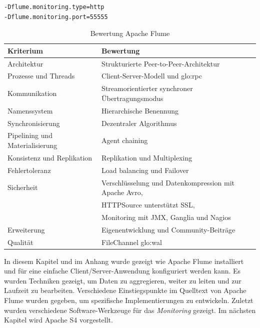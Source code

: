 \begin{lstlisting}[language=BASH, label=lst:flumeMonitoring, caption=Apache Flume Monitoring]
-Dflume.monitoring.type=http
-Dflume.monitoring.port=55555
\end{lstlisting}

\begin{table}[ht!]
	\centering
		\begin{tabular}{@{}ll@{}} \toprule
			\textbf{Kriterium} & \textbf{Bewertung} \\ \midrule
			Architektur & Strukturierte Peer-to-Peer-Architektur \\
			Prozesse und Threads & Client-Server-Modell und \gls{glo:rpc} \\
			Kommunikation & Streamorientierter synchroner Übertragungsmodus \\
			Namenssystem & Hierarchische Benennung \\
			Synchronisierung & Dezentraler Algorithmus \\
			Pipelining und Materialisierung & Agent chaining \\
			Konsistenz und Replikation & Replikation und Multiplexing \\
			Fehlertoleranz & Load balancing und Failover \\ 
			Sicherheit & Verschlüsselung und Datenkompression mit Apache Avro, \\			
			& HTTPSource unterstützt SSL, \\
			& Monitoring mit JMX, Ganglia und Nagios\\
			Erweiterung & Eigenentwicklung und Community-Beiträge \\
			Qualität & FileChannel \gls{glo:wal} \\
			\bottomrule			
		\end{tabular}
	\caption{Bewertung Apache Flume}
	\label{tab:bewflume}
\end{table}

In diesem Kapitel und im Anhang wurde gezeigt wie Apache Flume installiert und für eine einfache Client/Server-Anwendung konfiguriert werden kann. Es wurden Techniken gezeigt, um Daten zu aggregieren, weiter zu leiten und zur Laufzeit zu bearbeiten. Verschiedene Einstiegspunkte im Quelltext von Apache Flume wurden gegeben, um spezifische Implementierungen zu entwickeln. Zuletzt wurden verschiedene Software-Werkzeuge für das \textit{Monitoring} gezeigt. Im nächsten Kapitel wird Apache S4 vorgestellt.

